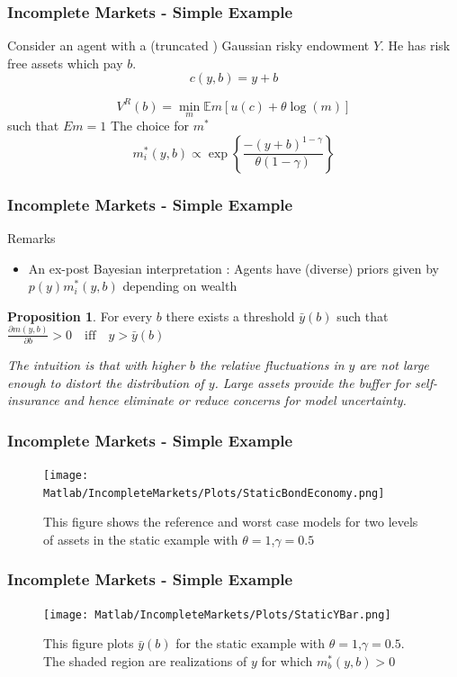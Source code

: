 \documentclass{beamer}
\theoremstyle{definition}
\newtheorem{proposition}{Proposition}%
\begin{document}
\begin{frame}
\frametitle{Incomplete Markets - Simple Example}
Consider an agent with a (truncated ) Gaussian risky endowment $Y$. He has risk
free assets which pay $b$. 
\[c(y,b)=y+b\]

\[V^R (b)=\min_{m}\mathbb{E}m[u(c)+\theta\log(m)]\]
such that 
$Em=1$
 The choice for $m^*$
\[m_i^*(y,b)\propto \exp\left\{\frac {-(y+b)^{1-\gamma}}{\theta(1-\gamma)}\right\}\]

\end{frame}


\begin{frame}
\frametitle{Incomplete Markets - Simple Example}

Remarks

\begin{itemize}
\item  An ex-post Bayesian interpretation : Agents have (diverse) priors
given by $p(y)m^*_i(y,b)$ depending on wealth
\end{itemize}
\begin{proposition}
For every $b$  there exists a threshold $\bar{y}(b)$ such that $\frac{\partial m(y,b)}{\partial b} >0 \quad \text{iff} \quad  y>\bar{y}(b)$
\end{proposition}

 \emph{The intuition is that with higher $b$ the relative fluctuations in $y$ are not large enough to distort the distribution of $y$. Large assets provide the buffer for self-insurance and hence eliminate or reduce concerns for model uncertainty.}
\end{frame}



\begin{frame}
\frametitle{Incomplete Markets - Simple Example}
\begin{figure}[htbp]
\centering
	  \texttt{[image: Matlab/IncompleteMarkets/Plots/StaticBondEconomy.png]}

	\caption{\small{This figure shows the reference and worst case models for two levels of assets in the static example with $\theta=1$,$\gamma=0.5$}}
	\label{fig:StaticBondEconomy}
\end{figure} 

\end{frame}

\begin{frame}
\frametitle{Incomplete Markets - Simple Example}
\begin{figure}[htbp]
\centering
	  \texttt{[image: Matlab/IncompleteMarkets/Plots/StaticYBar.png]}

	\caption{\small{This figure plots $\bar{y} (b)$ for the static example with $\theta=1$,$\gamma=0.5$. The shaded region are realizations of $y$ for which $m^*_b(y,b)>0$}}
	\label{fig:StaticYBar}
\end{figure} 
\end{frame}
\end{document}
